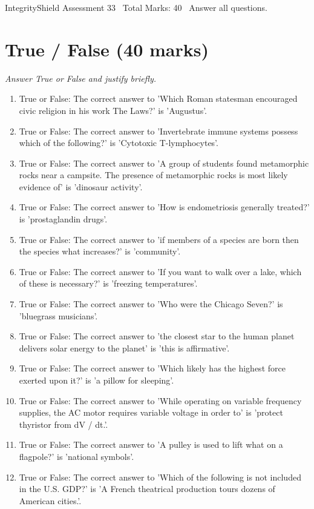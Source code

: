 \documentclass[12pt]{article}
\begin{document}
\begin{center}
IntegrityShield Assessment 33 \
Total Marks: 40 \
Answer all questions.
\end{center}

\section*{True / False (40 marks)}
\textit{Answer True or False and justify briefly.}
\begin{enumerate}[label=\arabic*.]
\item True or False: The correct answer to 'Which Roman statesman encouraged civic religion in his work The Laws?' is 'Augustus'.
\item True or False: The correct answer to 'Invertebrate immune systems possess which of the following?' is 'Cytotoxic T-lymphocytes'.
\item True or False: The correct answer to 'A group of students found metamorphic rocks near a campsite. The presence of metamorphic rocks is most likely evidence of' is 'dinosaur activity'.
\item True or False: The correct answer to 'How is endometriosis generally treated?' is 'prostaglandin drugs'.
\item True or False: The correct answer to 'if members of a species are born then the species what increases?' is 'community'.
\item True or False: The correct answer to 'If you want to walk over a lake, which of these is necessary?' is 'freezing temperatures'.
\item True or False: The correct answer to 'Who were the Chicago Seven?' is 'bluegrass musicians'.
\item True or False: The correct answer to 'the closest star to the human planet delivers solar energy to the planet' is 'this is affirmative'.
\item True or False: The correct answer to 'Which likely has the highest force exerted upon it?' is 'a pillow for sleeping'.
\item True or False: The correct answer to 'While operating on variable frequency supplies, the AC motor requires variable voltage in order to' is 'protect thyristor from dV / dt.'.
\item True or False: The correct answer to 'A pulley is used to lift what on a flagpole?' is 'national symbols'.
\item True or False: The correct answer to 'Which of the following is not included in the U.S. GDP?' is 'A French theatrical production tours dozens of American cities.'.

\end{enumerate}
\end{document}
